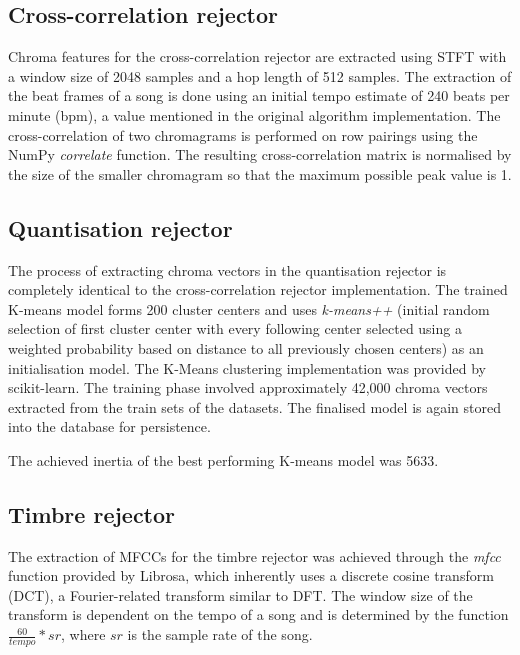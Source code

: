 \subsection{Cross-correlation rejector}
\label{subsec:ccsimplementation}

Chroma features for the cross-correlation rejector are extracted using STFT with
a window size of 2048 samples and a hop length of 512 samples. The extraction of
the beat frames of a song is done using an initial tempo estimate of 240 beats
per minute (bpm), a value mentioned in the original algorithm implementation.
The cross-correlation of two chromagrams is performed on row pairings using the
NumPy \textit{correlate} function. The resulting cross-correlation matrix is
normalised by the size of the smaller chromagram so that the maximum possible
peak value is 1.

\subsection{Quantisation rejector}
\label{subsec:quantisationimplementation}

The process of extracting chroma vectors in the quantisation rejector is
completely identical to the cross-correlation rejector implementation. The
trained K-means model forms 200 cluster centers and uses \textit{k-means++}
(initial random selection of first cluster center with every following center
selected using a weighted probability based on distance to all previously chosen
centers) as an initialisation model. The K-Means clustering implementation was
provided by scikit-learn. The training phase involved approximately 42,000
chroma vectors extracted from the train sets of the datasets. The finalised
model is again stored into the database for persistence.

The achieved inertia of the best performing K-means model was 5633.

\subsection{Timbre rejector}
\label{subsec:timbreimplementation}

The extraction of MFCCs for the timbre rejector was achieved through the
\textit{mfcc} function provided by Librosa, which inherently uses a discrete
cosine transform (DCT), a Fourier-related transform similar to DFT. The window
size of the transform is dependent on the tempo of a song and is determined by
the function $\frac{60}{tempo} * sr$, where $sr$ is the sample rate of the song.

